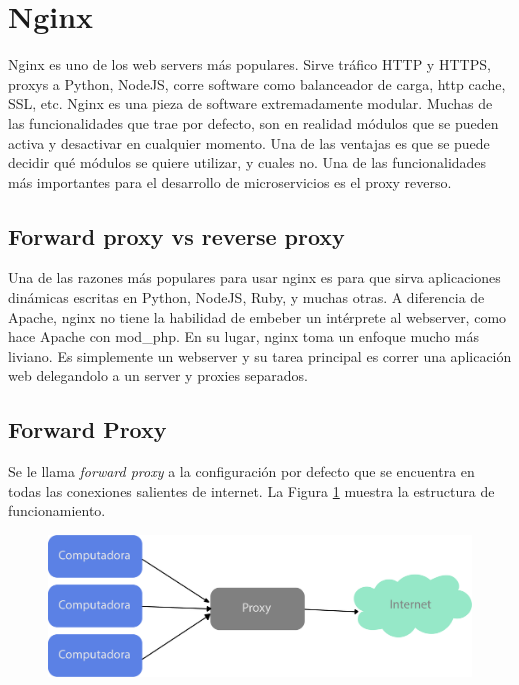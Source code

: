 \section[Nginx]{Nginx}

Nginx es uno de los web servers más populares. Sirve tráfico HTTP y HTTPS, proxys a Python, NodeJS, corre software como balanceador de carga, http cache, SSL, etc.
Nginx es una pieza de software extremadamente modular. Muchas de las funcionalidades que trae por defecto, son en realidad módulos que se pueden activa y desactivar en cualquier momento. Una de las ventajas es que se puede decidir qué módulos se quiere utilizar, y cuales no.
Una de las funcionalidades más importantes para el desarrollo de microservicios es el proxy reverso.

\subsection[Forward proxy vs reverse proxy]{Forward proxy vs reverse proxy}

Una de las razones más populares para usar nginx es para que sirva aplicaciones dinámicas escritas en Python, NodeJS, Ruby, y muchas otras.
A diferencia de Apache, nginx no tiene la habilidad de embeber un intérprete al webserver, como hace Apache con mod\_php. En su lugar, nginx toma un enfoque mucho más liviano. Es simplemente un webserver y su tarea principal es correr una aplicación web delegandolo a un server y proxies separados.

\subsection[Forward Proxy]{Forward Proxy}

Se le llama \textit{forward proxy} a la configuración por defecto que se encuentra en todas las conexiones salientes de internet. La Figura \ref{fig:forwardproxy} muestra la estructura de funcionamiento.

\begin{figure}[h!]
  \centering
    \includegraphics[scale=0.7]{images/forward-proxy.png}
  \label{fig:forwardproxy}
\end{figure}

